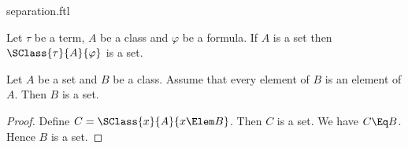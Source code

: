 \documentclass{stex}
\begin{document}
\begin{smodule}{separation.ftl}


\begin{fakeforthel}
  \begin{axiom}
    Let $\tau$ be a term, $A$ be a class and $\varphi$ be a formula.
    If $A$ is a set then $\SClass{\tau}{A}{\varphi}$ is a set.
  \end{axiom}
\end{fakeforthel}

\begin{forthel}
  \begin{corollary}
    Let $A$ be a set and $B$ be a class.
    Assume that every element of $B$ is an element of $A$.
    Then $B$ is a set.
  \end{corollary}
  \begin{proof}
    Define $C = \SClass{x}{A}{x \Elem B}$.
    Then $C$ is a set.
    We have $C \Eq B$.
    Hence $B$ is a set.
  \end{proof}
\end{forthel}

\end{smodule}
\end{document}
